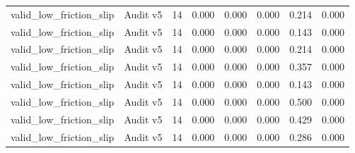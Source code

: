 {\begin{longtable}{llrrrrrr}
valid\_low\_friction\_slip & Audit v5 & 14 & 0.000 & 0.000 & 0.000 & 0.214 & 0.000 \\
valid\_low\_friction\_slip & Audit v5 & 14 & 0.000 & 0.000 & 0.000 & 0.143 & 0.000 \\
valid\_low\_friction\_slip & Audit v5 & 14 & 0.000 & 0.000 & 0.000 & 0.214 & 0.000 \\
valid\_low\_friction\_slip & Audit v5 & 14 & 0.000 & 0.000 & 0.000 & 0.357 & 0.000 \\
valid\_low\_friction\_slip & Audit v5 & 14 & 0.000 & 0.000 & 0.000 & 0.143 & 0.000 \\
valid\_low\_friction\_slip & Audit v5 & 14 & 0.000 & 0.000 & 0.000 & 0.500 & 0.000 \\
valid\_low\_friction\_slip & Audit v5 & 14 & 0.000 & 0.000 & 0.000 & 0.429 & 0.000 \\
valid\_low\_friction\_slip & Audit v5 & 14 & 0.000 & 0.000 & 0.000 & 0.286 & 0.000 \\
\bottomrule
\end{longtable}
}
